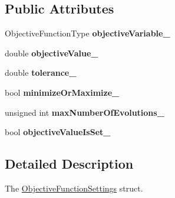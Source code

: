 \subsection*{Public Attributes}
\begin{DoxyCompactItemize}
\item 
Objective\+Function\+Type {\bfseries objective\+Variable\+\_\+}\hypertarget{structtudat_1_1optimization_1_1ObjectiveFunctionSettings_acecfcd896b5d5f2cd8a85daf57c8be41}{}\label{structtudat_1_1optimization_1_1ObjectiveFunctionSettings_acecfcd896b5d5f2cd8a85daf57c8be41}

\item 
double {\bfseries objective\+Value\+\_\+}\hypertarget{structtudat_1_1optimization_1_1ObjectiveFunctionSettings_aca5decdbe37ed0f7730ca015e8c1ac01}{}\label{structtudat_1_1optimization_1_1ObjectiveFunctionSettings_aca5decdbe37ed0f7730ca015e8c1ac01}

\item 
double {\bfseries tolerance\+\_\+}\hypertarget{structtudat_1_1optimization_1_1ObjectiveFunctionSettings_a5637f6f6ada50e763c4014fb41e1e86d}{}\label{structtudat_1_1optimization_1_1ObjectiveFunctionSettings_a5637f6f6ada50e763c4014fb41e1e86d}

\item 
bool {\bfseries minimize\+Or\+Maximize\+\_\+}\hypertarget{structtudat_1_1optimization_1_1ObjectiveFunctionSettings_a29d471241f521e1697dba14424704bc5}{}\label{structtudat_1_1optimization_1_1ObjectiveFunctionSettings_a29d471241f521e1697dba14424704bc5}

\item 
unsigned int {\bfseries max\+Number\+Of\+Evolutions\+\_\+}\hypertarget{structtudat_1_1optimization_1_1ObjectiveFunctionSettings_abacc475762ba7bafd125be28f9095880}{}\label{structtudat_1_1optimization_1_1ObjectiveFunctionSettings_abacc475762ba7bafd125be28f9095880}

\item 
bool {\bfseries objective\+Value\+Is\+Set\+\_\+}\hypertarget{structtudat_1_1optimization_1_1ObjectiveFunctionSettings_a9a893337af8c92286b267421e7a92209}{}\label{structtudat_1_1optimization_1_1ObjectiveFunctionSettings_a9a893337af8c92286b267421e7a92209}

\end{DoxyCompactItemize}


\subsection{Detailed Description}
The \hyperlink{structtudat_1_1optimization_1_1ObjectiveFunctionSettings}{Objective\+Function\+Settings} struct. 


